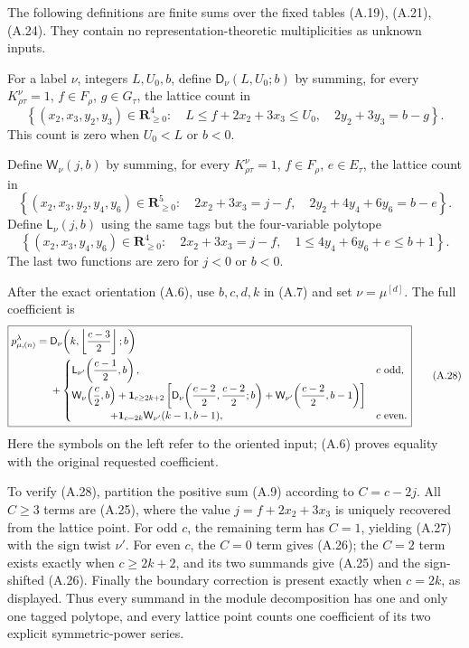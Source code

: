 \documentclass[
  10pt,
]{article}
\begin{document}
The following definitions are finite sums over the fixed tables (A.19),
(A.21), (A.24). They contain no representation-theoretic multiplicities
as unknown inputs.

For a label \(\nu\), integers \(L,U_0,b\), define
\(\mathsf D_\nu(L,U_0;b)\) by summing, for every
\(K_{\rho\tau}^{\nu}=1\), \(f\in F_\rho\), \(g\in G_\tau\), the lattice
count in \[
\left\{(x_2,x_3,y_2,y_3)\in\mathbf R_{\ge0}^4:
\quad L\le f+2x_2+3x_3\le U_0,\quad
2y_2+3y_3=b-g\right\}.
\tag{A.25}
\] This count is zero when \(U_0<L\) or \(b<0\).

Define \(\mathsf W_\nu(j,b)\) by summing, for every
\(K_{\rho\tau}^{\nu}=1\), \(f\in F_\rho\), \(e\in E_\tau\), the lattice
count in \[
\left\{(x_2,x_3,y_2,y_4,y_6)\in\mathbf R_{\ge0}^5:
\quad 2x_2+3x_3=j-f,\quad
2y_2+4y_4+6y_6=b-e\right\}.
\tag{A.26}
\] Define \(\mathsf L_\nu(j,b)\) using the same tags but the
four-variable polytope \[
\left\{(x_2,x_3,y_4,y_6)\in\mathbf R_{\ge0}^4:
\quad 2x_2+3x_3=j-f,\quad
1\le4y_4+6y_6+e\le b+1\right\}.
\tag{A.27}
\] The last two functions are zero for \(j<0\) or \(b<0\).

After the exact orientation (A.6), use \(b,c,d,k\) in (A.7) and set
\(\nu=\mu^{[d]}\). The full coefficient is \[
\boxed{
\begin{aligned}
p_{\mu,(n)}^\lambda
={}&\mathsf D_\nu\!\left(k,\left\lfloor\frac{c-3}{2}\right\rfloor;b\right)\\
&+\begin{cases}
\displaystyle
\mathsf L_{\nu'}\!\left(\frac{c-1}{2},b\right),
&c\text{ odd},\\[2mm]
\displaystyle
\mathsf W_\nu\!\left(\frac c2,b\right)
+\mathbf1_{c\ge2k+2}
\left[
\mathsf D_\nu\!\left(\frac{c-2}{2},\frac{c-2}{2};b\right)
+\mathsf W_{\nu'}\!\left(\frac{c-2}{2},b-1\right)
\right]\\
\displaystyle\hspace{13mm}
+\mathbf1_{c=2k}\mathsf W_{\nu'}(k-1,b-1),
&c\text{ even}.
\end{cases}
\end{aligned}}
\tag{A.28}
\] Here the symbols on the left refer to the oriented input; (A.6)
proves equality with the original requested coefficient.

To verify (A.28), partition the positive sum (A.9) according to
\(C=c-2j\). All \(C\ge3\) terms are (A.25), where the value
\(j=f+2x_2+3x_3\) is uniquely recovered from the lattice point. For odd
\(c\), the remaining term has \(C=1\), yielding (A.27) with the sign
twist \(\nu'\). For even \(c\), the \(C=0\) term gives (A.26); the
\(C=2\) term exists exactly when \(c\ge2k+2\), and its two summands give
(A.25) and the sign-shifted (A.26). Finally the boundary correction is
present exactly when \(c=2k\), as displayed. Thus every summand in the
module decomposition has one and only one tagged polytope, and every
lattice point counts one coefficient of its two explicit symmetric-power
series.
\end{document}
